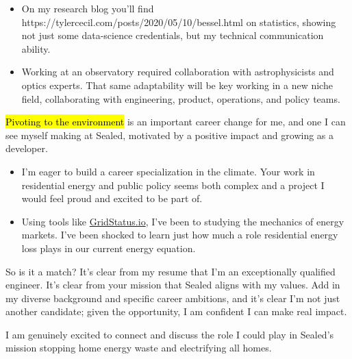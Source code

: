\documentclass{tc_cv}
\begin{document}
\begin{adjustwidth}{40pt}{40pt}
  \begin{itemize}

    \item On my research blog you'll find \cite{Jupyter
      notebooks}{https://tylercecil.com/posts/2020/05/10/bessel.html} on
      statistics, showing not just some data-science credentials, but my
      technical communication ability.

    \item Working at an observatory required collaboration with astrophysicists
      and optics experts. That same adaptability will be key working in a new
      niche field, collaborating with engineering, product, operations, and
      policy teams.

  \end{itemize} \medskip

  \hl{Pivoting to the environment} is an important career change for me, and
  one I can see myself making at Sealed, motivated by a positive impact
  and growing as a developer.
  \begin{itemize}

    \item I'm eager to build a career specialization in the climate. Your work
      in residential energy and public policy seems both complex and a project
      I would feel proud and excited to be part of.

    \item Using tools like \href{http://gridwatch.io}{GridStatus.io}, I've been
      to studying the mechanics of energy markets. I've been shocked to learn
      just how much a role residential energy loss plays in our current energy
      equation.

  \end{itemize} \medskip

  So is it a match? It's clear from my resume that I'm an exceptionally
  qualified engineer. It's clear from your mission that Sealed aligns with my
  values. Add in my diverse background and specific career ambitions, and it's
  clear I'm not just another candidate; given the opportunity, I am confident I
  can make real impact. \medskip

  I am genuinely excited to connect and
  discuss the role I could play in Sealed's mission stopping home energy waste
  and electrifying all homes.


\end{adjustwidth}
\end{document}
